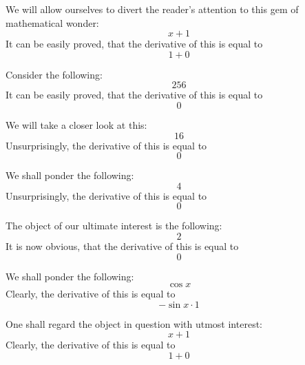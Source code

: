 \documentclass{article}
\begin{document}
We will allow ourselves to divert the reader's attention to this gem of mathematical wonder:
\begin{equation}
x + 1 
\end{equation}
It can be easily proved, that the derivative of this is equal to
\begin{equation}
1 + 0 
\end{equation}

Consider the following:
\begin{equation}
256 
\end{equation}
It can be easily proved, that the derivative of this is equal to
\begin{equation}
0 
\end{equation}

We will take a closer look at this:
\begin{equation}
16 
\end{equation}
Unsurprisingly, the derivative of this is equal to
\begin{equation}
0 
\end{equation}

We shall ponder the following:
\begin{equation}
4 
\end{equation}
Unsurprisingly, the derivative of this is equal to
\begin{equation}
0 
\end{equation}

The object of our ultimate interest is the following:
\begin{equation}
2 
\end{equation}
It is now obvious, that the derivative of this is equal to
\begin{equation}
0 
\end{equation}

We shall ponder the following:
\begin{equation}
\cos x 
\end{equation}
Clearly, the derivative of this is equal to
\begin{equation}
-\sin x \cdot 1 
\end{equation}

One shall regard the object in question with utmost interest:
\begin{equation}
x + 1 
\end{equation}
Clearly, the derivative of this is equal to
\begin{equation}
1 + 0 
\end{equation}
\end{document}

